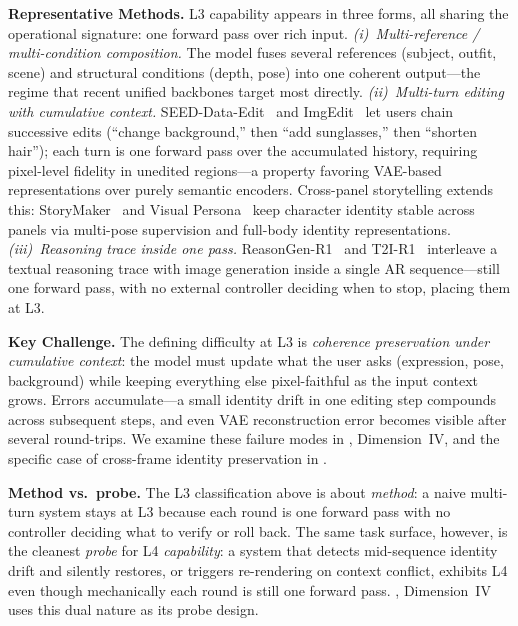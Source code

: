 \documentclass{llmxive}
\begin{document}
\textbf{Representative Methods.} L3 capability appears in three forms, all sharing the operational signature: one forward pass over rich input. \textit{(i)~Multi-reference / multi-condition composition.} The model fuses several references (subject, outfit, scene) and structural conditions (depth, pose) into one coherent output---the regime that recent unified backbones target most directly. \textit{(ii)~Multi-turn editing with cumulative context.} SEED-Data-Edit~\citep{ge2024seed} and ImgEdit~\citep{ye2025imgedit} let users chain successive edits (``change background,'' then ``add sunglasses,'' then ``shorten hair''); each turn is one forward pass over the accumulated history, requiring pixel-level fidelity in unedited regions---a property favoring VAE-based representations over purely semantic encoders. Cross-panel storytelling extends this: StoryMaker~\citep{zhou2024storymaker} and Visual Persona~\citep{nam2025visual} keep character identity stable across panels via multi-pose supervision and full-body identity representations. \textit{(iii)~Reasoning trace inside one pass.} ReasonGen-R1~\citep{zhang2025reasongen} and T2I-R1~\citep{jiang2025t2i} interleave a textual reasoning trace with image generation inside a single AR sequence---still one forward pass, with no external controller deciding when to stop, placing them at L3.

\textbf{Key Challenge.} The defining difficulty at L3 is \emph{coherence preservation under cumulative context}: the model must update what the user asks (expression, pose, background) while keeping everything else pixel-faithful as the input context grows. Errors accumulate---a small identity drift in one editing step compounds across subsequent steps, and even VAE reconstruction error becomes visible after several round-trips. We examine these failure modes in , Dimension~IV, and the specific case of cross-frame identity preservation in .

\textbf{Method vs.\ probe.} The L3 classification above is about \emph{method}: a naive multi-turn system stays at L3 because each round is one forward pass with no controller deciding what to verify or roll back. The same task surface, however, is the cleanest \emph{probe} for L4 \emph{capability}: a system that detects mid-sequence identity drift and silently restores, or triggers re-rendering on context conflict, exhibits L4 even though mechanically each round is still one forward pass. , Dimension~IV uses this dual nature as its probe design.
\end{document}
